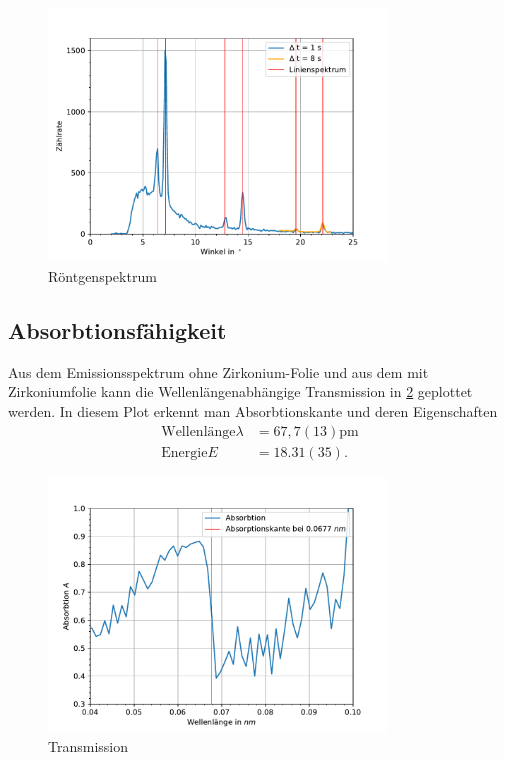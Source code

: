 \documentclass[11pt, a4paper]{article}
\begin{document}
    \begin{figure}
        \centering
        \includegraphics[width=0.8\textwidth]{NaCl-Spektrum.pdf}
        \caption{Röntgenspektrum}
        \label{fig:roentgenspektrum}
    \end{figure}

    \subsection{Absorbtionsfähigkeit}

    Aus dem Emissionsspektrum ohne Zirkonium-Folie und aus dem mit Zirkoniumfolie kann die Wellenlängenabhängige Transmission in \ref{fig:trans} geplottet werden. In diesem Plot erkennt man Absorbtionskante und deren Eigenschaften
    \begin{align}
        \text{Wellenlänge} \lambda &= 67,7(13) \si{\pico\meter}\\
        \text{Energie} E &= 18.31(35).
    \end{align}

    \begin{figure}
        \centering
        \includegraphics[width=0.8\textwidth]{Zirkonium.pdf}
        \caption{Transmission}
        \label{fig:trans}
    \end{figure}
\end{document}
